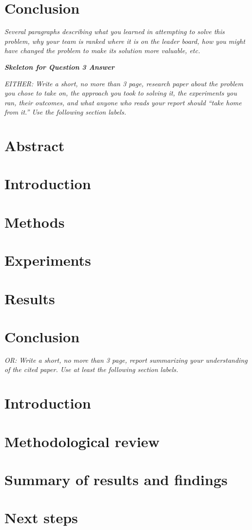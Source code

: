 \documentclass{article}
\begin{document}
\section{Conclusion}
\emph{Several paragraphs describing what you learned in attempting to solve this problem, why your team is ranked where it is on the leader board, how you might have changed the problem to make its solution more valuable, etc.}
\newpage

{\em \bf Skeleton for Question 3 Answer}
\setcounter{section}{0}

\emph{EITHER: Write a short, no more than 3 page, research paper about the problem you chose
to take on, the approach you took to solving it, the experiments you ran,
their outcomes, and what anyone who reads your report should ``take home from it.''  Use the following section labels.}

\section{Abstract}
\section{Introduction}
\section{Methods}
\section{Experiments}
\section{Results}
\section{Conclusion}

\emph{OR: Write a short, no more than 3 page, report summarizing your understanding of the cited paper.  Use at least the following section labels.}
\setcounter{section}{0}

\section{Introduction}
\section{Methodological review} 
\section{Summary of results and findings}
\section{Next steps}
\end{document}
